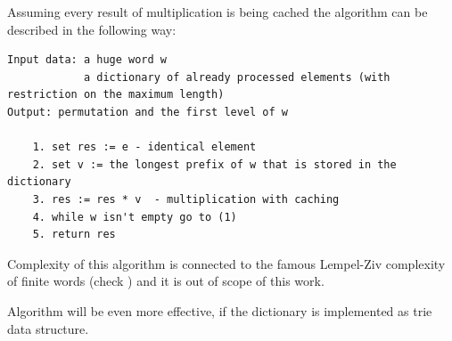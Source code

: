 \documentclass[a4paper,12pt]{amsart}
\begin{document}
Assuming every result of multiplication is being cached the algorithm can be described in the following way: 

\begin{lstlisting}
Input data: a huge word w
            a dictionary of already processed elements (with restriction on the maximum length)
Output: permutation and the first level of w

    1. set res := e - identical element
    2. set v := the longest prefix of w that is stored in the dictionary
    3. res := res * v  - multiplication with caching 
    4. while w isn't empty go to (1)
    5. return res
\end{lstlisting}

Complexity of this algorithm is connected to the famous Lempel-Ziv complexity of finite words (check \cite{Lempel-Ziv2}) and it is out of scope of this work. 

Algorithm will be even more effective, if the dictionary is implemented as trie data structure. \cite{Algorithms} 


\newpage
\end{document}
